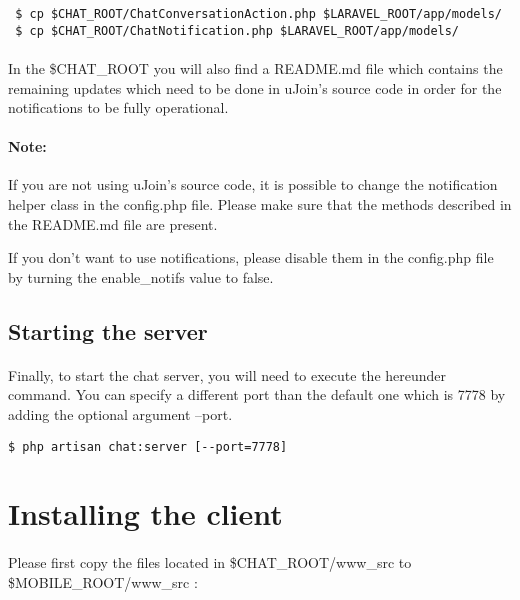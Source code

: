 \begin{verbatim}
 $ cp $CHAT_ROOT/ChatConversationAction.php $LARAVEL_ROOT/app/models/
 $ cp $CHAT_ROOT/ChatNotification.php $LARAVEL_ROOT/app/models/
\end{verbatim}

\paragraph{} In the \$CHAT\_ROOT you will also find a README.md file which 
contains the remaining updates which need to be done in uJoin's source code in 
order for the notifications to be fully operational.

\paragraph{Note:} If you are not using uJoin's source code, it is possible to 
change the notification helper class in the config.php file. 
Please make sure that the methods described in the README.md file are present.

If you don't want to use notifications, please disable them in the config.php 
file by turning the enable\_notifs value to false.

\subsection{Starting the server}

\paragraph{} Finally, to start the chat server, you will need to execute the 
hereunder command. You can specify a different port than the default one which 
is 7778 by adding the optional argument --port.

\begin{verbatim}
$ php artisan chat:server [--port=7778]
\end{verbatim}


\section{Installing the client}

\paragraph{} Please first copy the files located in \$CHAT\_ROOT/www\_src to \\
\$MOBILE\_ROOT/www\_src :

